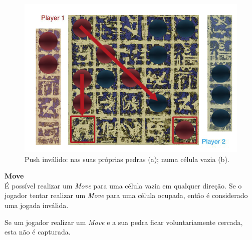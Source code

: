\documentclass[a4paper]{article}
\begin{document}
\begin{figure}[!htb]
	\centering
	\includegraphics[scale=0.2]{images/invalid_push.png} 
	\caption{Push inválido: nas suas próprias pedras (a); numa célula vazia (b).}
\end{figure}

\textbf{Move}\\

É possível realizar um  \textit{Move} para uma célula vazia em qualquer direção. Se o jogador tentar realizar um \textit{Move} para uma célula ocupada, então é considerado uma jogada inválida.

Se um jogador realizar um \textit{Move} e a sua pedra ficar voluntariamente cercada, esta não é capturada.
\end{document}
